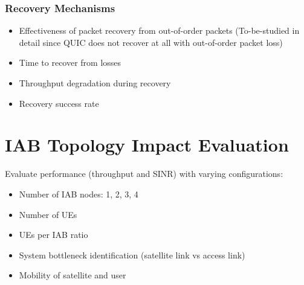 \documentclass[11pt,a4paper]{article}
\begin{document}
\subsubsection{Recovery Mechanisms}
\begin{itemize}
    \item Effectiveness of packet recovery from out-of-order packets (To-be-studied in detail since QUIC does not recover at all with out-of-order packet loss)
    \item Time to recover from losses
    \item Throughput degradation during recovery
    \item Recovery success rate
\end{itemize}

\section{IAB Topology Impact Evaluation}

Evaluate performance (throughput and SINR) with varying configurations:
\begin{itemize}
    \item Number of IAB nodes: 1, 2, 3, 4
    \item Number of UEs
    \item UEs per IAB ratio
    \item System bottleneck identification (satellite link vs access link)
    \item Mobility of satellite and user
\end{itemize}
\end{document}

